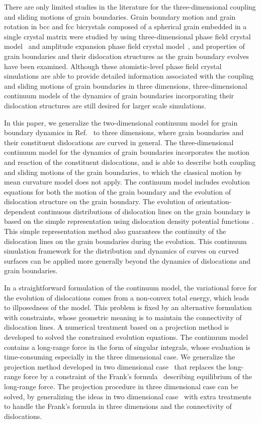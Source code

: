 There are only limited studies in the literature for the three-dimensional coupling and sliding motions of grain boundaries.
Grain boundary motion and grain rotation in bcc and fcc bicrystals composed of
a spherical grain embedded in a single crystal matrix were studied by using three-dimensional phase field crystal model~\cite{yamanaka2017phase} and amplitude expansion phase field crystal model~\cite{salvalaglio2018defects}, and  properties of grain boundaries and their dislocation structures as the grain boundary evolves have been examined.
Although these atomistic-level phase field crystal simulations are able to provide detailed information associated with the coupling and sliding motions of grain boundaries in three dimensions, three-dimensional continuum models of the dynamics of grain boundaries incorporating their dislocation structures are still desired for larger scale simulations.


In this paper, we generalize the two-dimensional continuum model for grain boundary dynamics in Ref.~\cite{zhang2018motion,zhang2019new} to three dimensions, where grain boundaries and their constituent dislocations are curved in general. The three-dimensional continuum model for the dynamics of grain boundaries incorporates the motion and reaction of the constituent dislocations, and is able to describe  both coupling and sliding motions of the grain boundaries, to which the classical motion by mean curvature model does not apply. The continuum model includes evolution equations for both the motion of the grain boundary and the evolution of dislocation structure on the grain boundary. The evolution of orientation-dependent continuous distributions of dislocation lines on the grain boundary is based on the simple representation using dislocation density potential functions \cite{zhu2014continuum}.
This simple representation method also guarantees the continuity of the dislocation lines on the grain boundaries during the evolution. This continuum simulation framework for the distribution and dynamics of curves on  curved surfaces can be applied more generally beyond  the dynamics of dislocations and grain boundaries.

In a straightforward formulation of the continuum model, the variational force for the evolution of dislocations comes from a non-convex total energy, which leads to illposedness of the model. This problem is fixed by an alternative  formulation with constraints, whose geometric meaning is to  maintain the connectivity of dislocation lines.
A numerical treatment based on a projection method is developed to solved the constrained evolution equations.
The continuum model contains a long-range force in the form of singular integrals, whose evaluation is time-consuming especially in the three dimensional case. We generalize the projection method developed in two dimensional case~\cite{zhang2019new} that replaces the long-range force by a constraint of the Frank’s formula~\cite{Frank1950,Bilby1955,zhu2014continuum} describing equilibrium of the long-range force. The projection procedure in three dimensional case can be solved, by generalizing the ideas in two dimensional case~\cite{zhang2019new} with extra treatments to handle the Frank's formula in three dimensions and the connectivity of dislocations.

